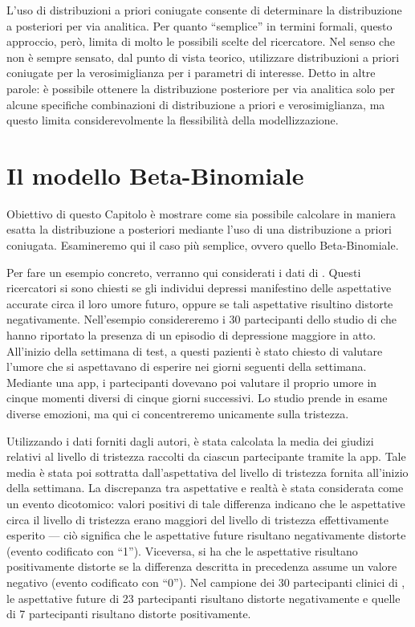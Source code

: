 \documentclass[
]{memoir}
\theoremstyle{definition}
\theoremstyle{definition}
\theoremstyle{definition}
\theoremstyle{definition}
\theoremstyle{remark}
\begin{document}
L'uso di distribuzioni a priori coniugate consente di determinare la distribuzione a posteriori per via analitica. Per quanto ``semplice'' in termini formali, questo approccio, però, limita di molto le possibili scelte del ricercatore. Nel senso che non è sempre sensato, dal punto di vista teorico, utilizzare distribuzioni a priori coniugate per la verosimiglianza per i parametri di interesse.
Detto in altre parole: è possibile ottenere la distribuzione posteriore per via analitica solo per alcune specifiche combinazioni di distribuzione a priori e verosimiglianza, ma questo limita considerevolmente la flessibilità della modellizzazione.

\hypertarget{chapter-distr-priori-coniugate}{%
\section{Il modello Beta-Binomiale}\label{chapter-distr-priori-coniugate}}

Obiettivo di questo Capitolo è mostrare come sia possibile calcolare in maniera esatta la distribuzione a posteriori mediante l'uso di una distribuzione a priori coniugata. Esamineremo qui il caso più semplice, ovvero quello Beta-Binomiale.

Per fare un esempio concreto, verranno qui considerati i dati di \citet{zetschefuture2019}. Questi ricercatori si sono chiesti se gli individui depressi manifestino delle aspettative accurate circa il loro umore futuro, oppure se tali aspettative risultino distorte negativamente. Nell'esempio considereremo i 30 partecipanti dello studio di \citet{zetschefuture2019} che hanno riportato la presenza di un episodio di depressione maggiore in atto. All'inizio della settimana di test, a questi pazienti è stato chiesto di valutare l'umore che si aspettavano di esperire nei giorni seguenti della settimana. Mediante una app, i partecipanti dovevano poi valutare il proprio umore in cinque momenti diversi di cinque giorni successivi. Lo studio prende in esame diverse emozioni, ma qui ci concentreremo unicamente sulla tristezza.

Utilizzando i dati forniti dagli autori, è stata calcolata la media dei giudizi relativi al livello di tristezza raccolti da ciascun partecipante tramite la app. Tale media è stata poi sottratta dall'aspettativa del livello di tristezza fornita all'inizio della settimana. La discrepanza tra aspettative e realtà è stata considerata come un evento dicotomico: valori positivi di tale differenza indicano che le aspettative circa il livello di tristezza erano maggiori del livello di tristezza effettivamente esperito --- ciò significa che le aspettative future risultano negativamente distorte (evento codificato con ``1''). Viceversa, si ha che le aspettative risultano positivamente distorte se la differenza descritta in precedenza assume un valore negativo (evento codificato con ``0''). Nel campione dei 30 partecipanti clinici di \citet{zetschefuture2019}, le aspettative future di 23 partecipanti risultano distorte negativamente e quelle di 7 partecipanti risultano distorte positivamente.
\end{document}
